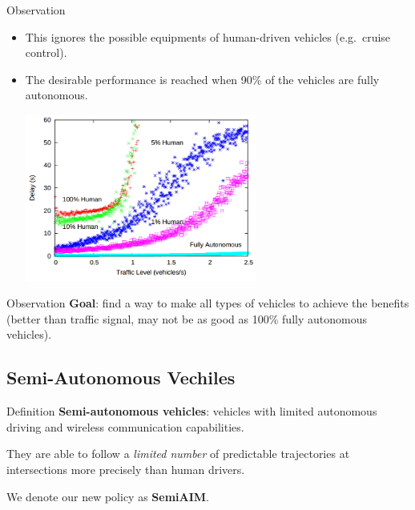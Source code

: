 \documentclass{beamer}
\newcommand{\goal}{find a way to make all types of vehicles to
achieve the benefits (better than traffic signal, may not be as good
as 100\% fully autonomous vehicles)}
\begin{document}
\begin{frame}{Observation}
\begin{itemize}
\item This ignores the possible equipments of human-driven vehicles
(e.g.\ cruise control).
\item The desirable performance is reached when 90\% of the vehicles
are fully autonomous.\pause \cite{bib:Dresner08Multiagent}

\includegraphics[width=0.6\textwidth]{bad_human.png}
\end{itemize}
\end{frame}

\begin{frame}{Observation}
\textbf{Goal}: \goal.
\end{frame}

\subsection{Semi-Autonomous Vechiles}

\begin{frame}{Definition}
\textbf{Semi-autonomous vehicles}: vehicles with limited autonomous
driving and wireless communication capabilities.\pause

\hfill

They are able to follow a \textit{limited number} of predictable
trajectories at intersections more precisely than human drivers.

\hfill

We denote our new policy as \textbf{SemiAIM}.
\end{frame}
\end{document}
